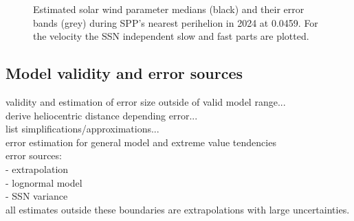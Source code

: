 \begin{figure}
	\caption{Estimated solar wind parameter medians (black) and their error bands (grey) during SPP's nearest perihelion in 2024 at \SI{0.0459}{\au}. For the velocity the SSN independent slow and fast parts are plotted.}
	\label{fig:SPP_perihelia_prediction_nearest_c_plot}
\end{figure}

\subsection{Model validity and error sources}
\label{sec:model_validity_and_errors}

validity and estimation of error size outside of valid model range...\\
derive heliocentric distance depending error...\\

list simplifications/approximations...\\

error estimation for general model and extreme value tendencies\\

error sources:\\
- extrapolation\\
- lognormal model\\
- SSN variance\\

all estimates outside these boundaries are extrapolations with large uncertainties.\\

